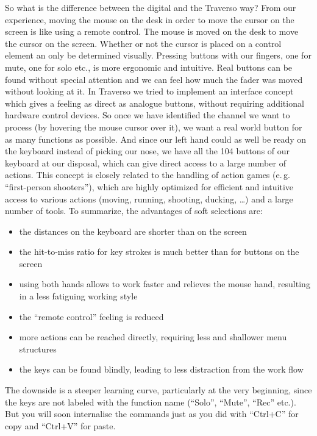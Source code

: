 So what is the difference between the digital and the Traverso way? From our experience, moving the mouse on the desk in order to move the cursor on the screen is like using a remote control. The mouse is moved on the desk to move the cursor on the screen. Whether or not the cursor is placed on a control element an only be determined visually. Pressing buttons with our fingers, one for mute, one for solo etc., is more ergonomic and intuitive. Real buttons can be found without special attention and we can feel how much the fader was moved without looking at it. In Traverso we tried to implement an interface concept which gives a feeling as direct as analogue buttons, without requiring additional hardware control devices. So once we have identified the channel we want to process (by hovering the mouse cursor over it), we want a real world button for as many functions as possible. And since our left hand could as well be ready on the keyboard instead of picking our nose, we have all the 104 buttons of our keyboard at our disposal, which can give direct access to a large number of actions. This concept is closely related to the handling of action games (e.\,g. ``first-person shooters''), which are highly optimized for efficient and intuitive access to various actions (moving, running, shooting, ducking, \dots) and a large number of tools. To summarize, the advantages of soft selections are:

\begin{itemize}
 \item the distances on the keyboard are shorter than on the screen
 \item the hit-to-miss ratio for key strokes is much better than for buttons on the screen
 \item using both hands allows to work faster and relieves the mouse hand, resulting in a less fatiguing working style
 \item the ``remote control'' feeling is reduced
 \item more actions can be reached directly, requiring less and shallower menu structures
 \item the keys can be found blindly, leading to less distraction from the work flow
\end{itemize}

The downside is a steeper learning curve, particularly at the very beginning, since the keys are not labeled with the function name (``Solo'', ``Mute'', ``Rec'' etc.). But you will soon internalise the commands just as you did with ``Ctrl+C'' for copy and ``Ctrl+V'' for paste.
